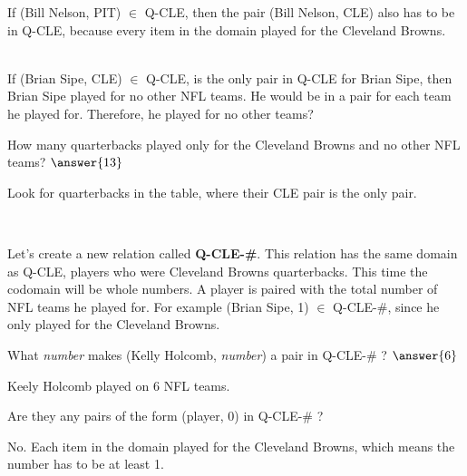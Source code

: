 \documentclass{ximera}
\begin{document}
\begin{fact}

If (Bill Nelson, PIT) $\in$ Q-CLE, then the pair (Bill Nelson, CLE) also has to be in Q-CLE, because every item in the domain played for the Cleveland Browns.

\quad \\

If (Brian Sipe, CLE) $\in$ Q-CLE, is the only pair in Q-CLE for Brian Sipe, then Brian Sipe played for no other NFL teams.  He would be in a pair for each team he played for. Therefore, he played for no other teams?



\begin{question} How many quarterbacks played only for the Cleveland Browns and no other NFL teams? $\answer{13}$
\begin{feedback}
Look for quarterbacks in the table, where their CLE pair is the only pair.
\end{feedback}
\end{question}


\end{fact}


\quad \\


\begin{example}
Let's create a new relation called \textbf{Q-CLE-\#}. This relation has the same domain as Q-CLE, players who were Cleveland Browns quarterbacks. This time the codomain will be whole numbers. A player is paired with the total number of NFL teams he played for.
For example (Brian Sipe, 1) $\in$ Q-CLE-\#, since he only played for the Cleveland Browns.


\begin{question} 
What \textit{number} makes (Kelly Holcomb, \textit{number}) a pair in Q-CLE-\# ? $\answer{6}$
\begin{feedback}
Keely Holcomb played on 6 NFL teams.
\end{feedback}
\end{question}


\begin{question}
Are they any pairs of the form (player, 0) in Q-CLE-\# ?
\begin{multipleChoice} 
\end{multipleChoice}
\begin{feedback}
No. Each item in the domain played for the Cleveland Browns, which means the number has to be at least 1.
\end{feedback}
\end{question}


\end{example}
\end{document}
